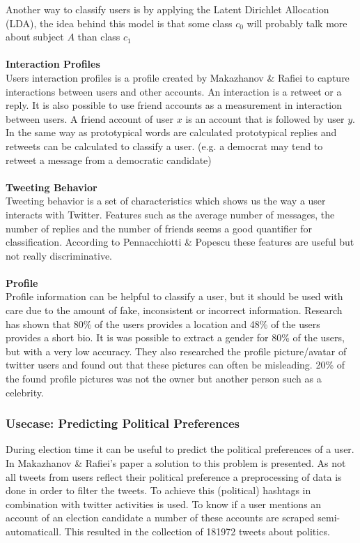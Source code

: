 \documentclass{article}
\begin{document}
Another way to classify users is by applying the Latent Dirichlet Allocation (LDA), the idea behind this model is that some class $c_0$ will probably talk more about subject $A$ than class $c_1$ %
\\\\
\textbf{Interaction Profiles}\\
Users interaction profiles is a profile created by Makazhanov \& Raﬁei to capture interactions between users and other accounts. \cite{pol} An interaction is a retweet or a reply. It is also possible to use friend accounts as a measurement in interaction between users.  A friend account of user $x$ is an account that is followed by user $y$. In the same way as prototypical words are calculated prototypical replies and retweets can be calculated to classify a user. (e.g. a democrat may tend to retweet a message from a democratic candidate) \cite{userclasst} 
\\\\  
\textbf{Tweeting Behavior}\\
Tweeting behavior is a set of characteristics which shows us the way a user interacts with Twitter. Features such as the average number of messages, the number of replies and the number of friends seems a good quantifier for classification. According to Pennacchiotti \& Popescu these features are useful but not really discriminative. \cite{userclasst} 
\\\\
\textbf{Profile}\\
Profile information can be helpful to classify a user, but it should be used with care due to the amount of fake, inconsistent or incorrect information. Research has shown that 80\% of the users provides a location and 48\% of the users provides a short bio. \cite{usermachine} It is was possible to extract a gender for 80\% of the users, but with a very low accuracy. They also researched the profile picture/avatar of twitter users and found out that these pictures can often be misleading. 20\% of the found profile pictures was not the owner but another person such as a celebrity. \cite{usermachine}

\subsubsection{Usecase: Predicting Political Preferences}
During election time it can be useful to predict the political preferences of a user. In Makazhanov \& Raﬁei's paper a solution to this problem is presented. As not all tweets from users reflect their political preference a preprocessing of data is done in order to filter the tweets. \cite{pol} To achieve this (political) hashtags in combination with twitter activities is used. To know if a user mentions an account of an election candidate a number of these accounts are scraped semi-automaticall. This resulted in the collection of 181972 tweets about politics.\cite{pol}
\end{document}
